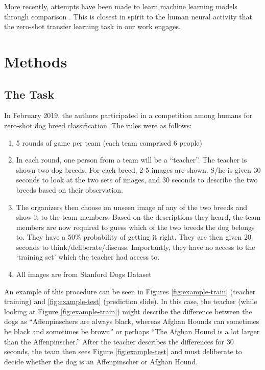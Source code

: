 \documentclass[sigplan,10pt]{acmart}
\begin{document}
More recently, attempts have been made to learn machine learning models through comparison \cite{cmu}. This is closest in spirit to the human neural activity that the zero-shot transfer learning task in our work engages.


\section{Methods}

\subsection{The Task}

In February 2019, the authors participated in a competition among humans for zero-shot dog breed classification. The rules were as follows:

\begin{enumerate}
\item 5 rounds of game per team (each team comprised 6 people)
\item In each round, one person from a team will be a ``teacher''. The teacher is shown two dog breeds. For each breed, 2-5 images are shown. S/he is given 30 seconds to look at the two sets of images, and 30 seconds to describe the two breeds based on their observation.
\item The organizers then choose on unseen image of any of the two breeds and show it to the team members. Based on the descriptions they heard, the team members are now required to guess which of the two breeds the dog belongs to. They have a 50\% probability of getting it right. They are then given 20 seconds to think/deliberate/discuss. Importantly, they have no access to the `training set' which the teacher had access to.
\item All images are from Stanford Dogs Dataset \cite{dognet}
\end{enumerate}


An example of this procedure can be seen in Figures \ref{fig:example-train} (teacher training) and \ref{fig:example-test} (prediction slide). In this case, the teacher (while looking at Figure \ref{fig:example-train}) might describe the difference between the dogs as ``Affenpinschers are always black, whereas Afghan Hounds can sometimes be black and sometimes be brown'' or perhaps ``The Afghan Hound is a lot larger than the Affenpinscher.'' After the teacher describes the differences for 30 seconds, the team then sees Figure \ref{fig:example-test} and must deliberate to decide whether the dog is an Affenpinscher or Afghan Hound.
\end{document}
